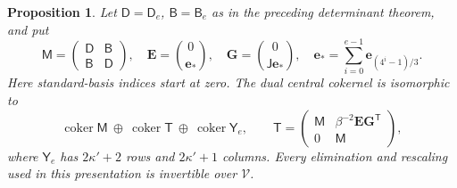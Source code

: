 \documentclass[11pt,a4paper,reqno]{amsart}
\numberwithin{equation}{section}
\theoremstyle{plain}
\newtheorem{proposition}[theorem]{Proposition}
\theoremstyle{definition}
\theoremstyle{remark}
\DeclareMathOperator{\coker}{coker}
\begin{document}
\begin{proposition}
Let $\mathsf D=\mathsf D_e$, $\mathsf B=\mathsf B_e$ as in the preceding determinant theorem, and put
\[
\mathsf M=\begin{pmatrix}\mathsf D&\mathsf B\\ \mathsf B&\mathsf D\end{pmatrix},\quad
\mathbf E=\binom0{\mathbf e_*},\quad \mathbf G=\binom0{\mathsf J\mathbf e_*},\quad
 \mathbf e_*=\sum_{i=0}^{e-1}\mathbf e_{(4^i-1)/3}.
\]
Here standard-basis indices start at zero. The dual central cokernel is isomorphic to
\[
\coker \mathsf M\ \oplus\ \coker \mathsf T\ \oplus\ \coker \mathsf Y_e,
\qquad
\mathsf T=\begin{pmatrix}\mathsf M&\beta^{-2}\mathbf E\mathbf G^{\mathsf T}\\0&\mathsf M\end{pmatrix},
\]
where $\mathsf Y_e$ has $2\kappa'+2$ rows and $2\kappa'+1$ columns. Every elimination and rescaling used in this presentation is invertible over $\mathcal V$.
\end{proposition}
\end{document}
